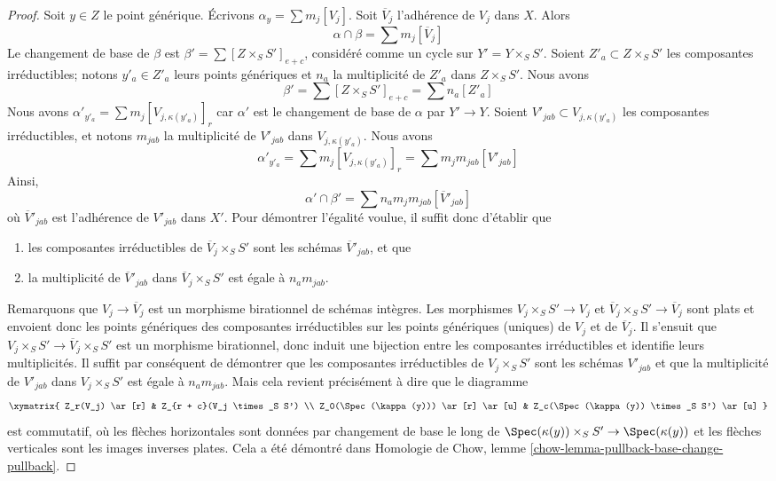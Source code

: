 \begin{proof}
\medskip\noindent
 Soit $y \in Z$ le point générique. Écrivons $\alpha_y = \sum m_j [V_j]$.
 Soit $\overline{V}_j$ l'adhérence de $V_j$ dans $X$. Alors 
$$
\alpha \cap \beta = \sum m_j[\overline{V}_j]
$$
 Le changement de base de $\beta$ est $\beta' = \sum [Z \times_S S']_{e + c}$, considéré
 comme un cycle sur $Y' = Y \times_S S'$. Soient $Z'_a \subset Z \times_S S'$
 les composantes irréductibles; notons $y'_a \in Z'_a$ leurs points 
génériques et $n_a$ la multiplicité de $Z'_a$ dans $Z \times_S S'$. 
Nous avons 
$$
\beta' = \sum [Z \times_S S']_{e + c} = \sum n_a[Z'_a]
$$
 Nous avons $\alpha'_{y'_a} = \sum m_j [V_{j, \kappa(y'_a)}]_r$
 car $\alpha'$ est le changement de base de $\alpha$ par $Y' \to Y$. 
Soient $V'_{jab} \subset V_{j, \kappa(y'_a)}$ les composantes irréductibles,
 et notons $m_{jab}$ la multiplicité de $V'_{jab}$
 dans $V_{j, \kappa(y'_a)}$. Nous avons 
$$
\alpha'_{y'_a} = \sum m_j [V_{j, \kappa(y'_a)}]_r =
\sum m_j m_{jab} [V'_{jab}]
$$
 Ainsi, 
$$
\alpha' \cap \beta' = \sum n_a m_j m_{jab} [\overline{V}'_{jab}]
$$
 où $\overline{V}'_{jab}$ est l'adhérence de $V'_{jab}$ dans $X'$.
 Pour démontrer l'égalité voulue, il suffit donc d'établir que 
\begin{enumerate} 
\item les composantes irréductibles de $\overline{V}_j \times_S S'$
 sont les schémas $\overline{V}'_{jab}$, et que 
\item la multiplicité de $\overline{V}'_{jab}$ dans 
$\overline{V}_j \times_S S'$ est égale à $n_a m_{jab}$. 
\end{enumerate} 
Remarquons que $V_j \to \overline{V}_j$ est un morphisme birationnel 
de schémas intègres. Les morphismes $V_j \times_S S' \to V_j$
 et $\overline{V}_j \times_S S' \to \overline{V}_j$ sont plats
 et envoient donc les points génériques des composantes irréductibles sur les
 points génériques (uniques) de $V_j$ et de $\overline{V}_j$.
 Il s'ensuit que $V_j \times_S S' \to \overline{V}_j \times_S S'$
 est un morphisme birationnel, donc induit une bijection entre les 
composantes irréductibles et identifie leurs multiplicités.
 Il suffit par conséquent de démontrer que les composantes irréductibles de 
$V_j \times_S S'$ sont les schémas $V'_{jab}$ et 
que la multiplicité de $V'_{jab}$ dans $V_j \times_S S'$
 est égale à $n_a m_{jab}$. Mais cela revient précisément à dire
 que le diagramme 
$$
\xymatrix{
Z_r(V_j) \ar[r] & Z_{r + c}(V_j \times_S S') \\
Z_0(\Spec(\kappa(y))) \ar[r] \ar[u] &
Z_c(\Spec(\kappa(y)) \times_S S') \ar[u]
}
$$
 est commutatif, où les flèches horizontales sont données par changement de base le long de 
$\Spec(\kappa(y)) \times_S S' \to \Spec(\kappa(y))$ et 
les flèches verticales sont les images inverses plates. Cela a été démontré 
dans Homologie de Chow, lemme \ref{chow-lemma-pullback-base-change-pullback}. 


\end{proof}
